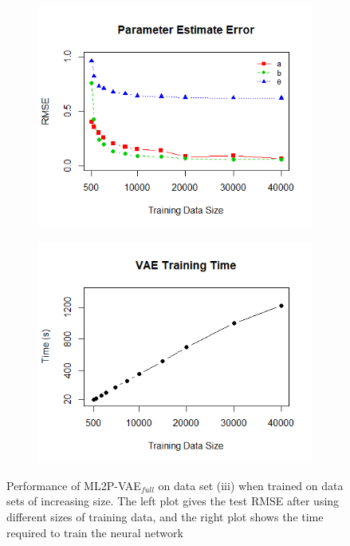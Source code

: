 \begin{figure}[h]
\centering
    \begin{subfigure}{.47\textwidth}
      \centering
      \includegraphics[width=\linewidth]{img/ml_journal_results/vae_full_train_size_error.png}
    \end{subfigure}
    \begin{subfigure}{.47\textwidth}
      \centering
      \includegraphics[width=\linewidth]{img/ml_journal_results/vae_full_train_size_time.png}
    \end{subfigure}
    \caption{Performance of ML2P-VAE$_{full}$ on data set (iii) when trained on data sets of increasing size. The left plot gives the test RMSE after using different sizes of training data, and the right plot shows the time required to train the neural network}
    \label{fig:train_size}
\end{figure}

